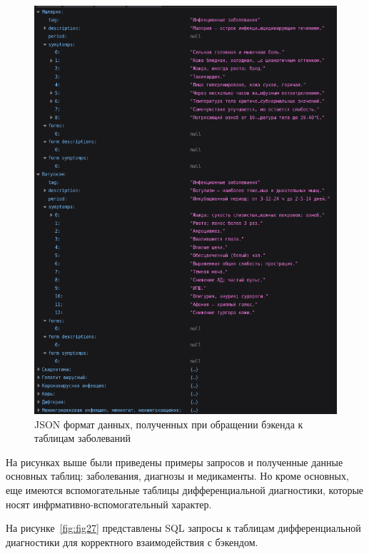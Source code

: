 \begin{figure}
  \includegraphics[scale=0.92]{inc/json_sh_dis_part_name2}
  \caption{JSON формат данных, полученных при обращении бэкенда к таблицам заболеваний}
  \label{fig:fig26}
\end{figure}

На рисунках выше были приведены примеры запросов и полученные данные основных таблиц: заболевания, диагнозы и медикаменты. Но кроме основных, еще имеются вспомогательные таблицы дифференциальной диагностики, которые носят инфрмативно-вспомогательный характер.

На рисунке~\ref{fig:fig27} представлены SQL запросы к таблицам дифференциальной диагностики для корректного взаимодействия с бэкендом.


